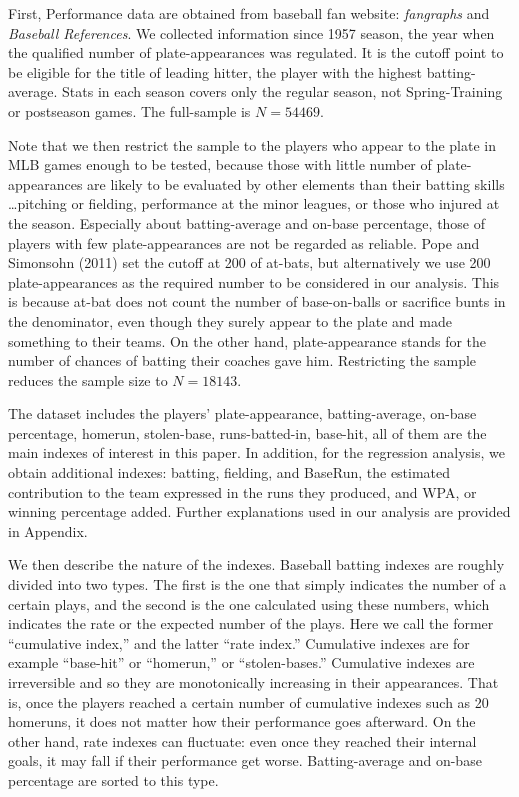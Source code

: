 \documentclass[dvipdfmx, 12pt]{article}
\begin{document}
First, Performance data are obtained from baseball fan website:  \textit{fangraphs} and \textit{Baseball References}. We collected information since 1957 season, the year when the qualified number of plate-appearances was regulated. It is the cutoff point to be eligible for the title of leading hitter, the player with the highest batting-average. Stats in each season covers only the regular season, not Spring-Training or postseason games. The full-sample is $N=54469$.

Note that we then restrict the sample to the players who appear to the plate in MLB games enough to be tested, because those with little number of plate-appearances are likely to be evaluated by other elements than their batting skills \ldots pitching or fielding, performance at the minor leagues, or those who injured at the season. Especially about batting-average and on-base percentage, those of players with few plate-appearances are not be regarded as reliable. Pope and Simonsohn (2011) set the cutoff at 200 of at-bats, but alternatively we use 200 plate-appearances as the required number to be considered in our analysis. This is because at-bat does not count the number of base-on-balls or sacrifice bunts in the denominator, even though they surely appear to the plate and made something to their teams. On the other hand, plate-appearance stands for the number of chances of batting their coaches gave him. Restricting the sample reduces the sample size to $N=18143$.

The dataset includes the players' plate-appearance, batting-average, on-base percentage, homerun, stolen-base, runs-batted-in, base-hit, all of them are the main indexes of interest in this paper. In addition, for the regression analysis, we obtain additional indexes: batting, fielding, and BaseRun, the estimated contribution to the team expressed in the runs they produced, and WPA, or winning percentage added. Further explanations used in our analysis are provided in Appendix.

We then describe the nature of the indexes. Baseball batting indexes are roughly divided into two types. The first is the one that simply indicates the number of a certain plays, and the second is the one calculated using these numbers, which indicates the rate or the expected number of the plays. Here we call the former ``cumulative index,'' and the latter ``rate index.'' Cumulative indexes are for example ``base-hit'' or ``homerun,'' or ``stolen-bases.'' Cumulative indexes are irreversible and so they are monotonically increasing in their appearances. That is, once the players reached a certain number of cumulative indexes such as 20 homeruns, it does not matter how their performance goes afterward. On the other hand, rate indexes can fluctuate: even once they reached their internal goals, it may fall if their performance get worse. Batting-average and on-base percentage are sorted to this type.
\end{document}
